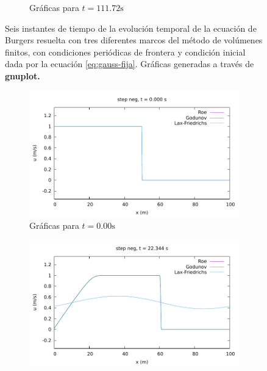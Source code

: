 \documentclass[12pt]{article}
\begin{document}
\begin{figure}[h!]
\begin{subfigure}{0.4\textwidth}
			\caption*{Gráficas para $t=111.72\unit{\second}$}
			\label{fig:gauss-perio6}
		\end{subfigure}
		\caption{Seis instantes de tiempo de la evolución temporal de  la ecuación de Burgers resuelta con tres diferentes marcos del método de volúmenes finitos, con condiciones periódicas de frontera y condición inicial dada por la ecuación \ref{eq:gauss-fija}. Gráficas generadas a través de \textbf{gnuplot.}}
		\label{fig:gauss-periodica}
	\end{figure}

	\begin{figure}[h!]
		\centering
		\begin{subfigure}{0.49\textwidth}
			\centering
			\includegraphics[width=\textwidth]{../burgers1DVF/results/sol_periodicas/step_neg/000.pdf}
			\caption*{Gráficas para $t=0.00\unit{\second}$}
			\label{fig:step_neg-perio1}
		\end{subfigure}\hfill
		\begin{subfigure}{0.49\textwidth}
			\centering
			\includegraphics[width=\textwidth]{../burgers1DVF/results/sol_periodicas/step_neg/021.pdf}

\end{subfigure}
\end{figure}
\end{document}
